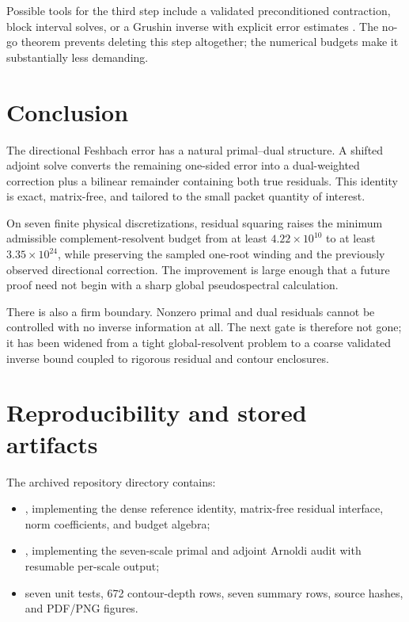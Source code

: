 \documentclass[11pt]{article}
\theoremstyle{definition}
\theoremstyle{remark}
\begin{document}
Possible tools for the third step include a validated preconditioned
contraction, block interval solves, or a Grushin inverse with explicit
error estimates \citep{SjoestrandZworski2007,TrefethenEmbree2005}.  The
no-go theorem prevents deleting this step altogether; the numerical budgets
make it substantially less demanding.

\section{Conclusion}
\label{sec:conclusion}

The directional Feshbach error has a natural primal--dual structure.  A
shifted adjoint solve converts the remaining one-sided error into a
dual-weighted correction plus a bilinear remainder containing both true
residuals.  This identity is exact, matrix-free, and tailored to the small
packet quantity of interest.

On seven finite physical discretizations, residual squaring raises the
minimum admissible complement-resolvent budget from at least
\(4.22\times10^{10}\) to at least \(3.35\times10^{24}\), while preserving
the sampled one-root winding and the previously observed directional
correction.  The improvement is large enough that a future proof need not
begin with a sharp global pseudospectral calculation.

There is also a firm boundary.  Nonzero primal and dual residuals cannot be
controlled with no inverse information at all.  The next gate is therefore
not gone; it has been widened from a tight global-resolvent problem to a
coarse validated inverse bound coupled to rigorous residual and contour
enclosures.

\appendix

\section{Reproducibility and stored artifacts}
\label{app:reproducibility}

The archived repository directory \citep{WangPrimalDualCode2026} contains:

\begin{itemize}
 \item {}, implementing the dense reference
 identity, matrix-free residual interface, norm coefficients, and budget
 algebra;
 \item {}, implementing the
 seven-scale primal and adjoint Arnoldi audit with resumable per-scale
 output;
 \item seven unit tests, 672 contour-depth rows, seven summary rows, source
 hashes, and PDF/PNG figures.
\end{itemize}
\end{document}
